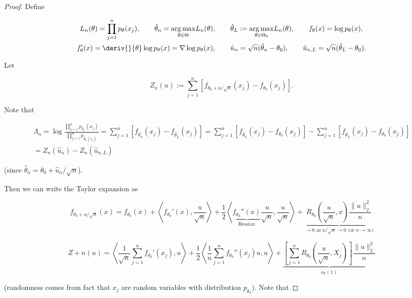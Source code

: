 \begin{proof} Define

\begin{multline*}
L_n(\theta) = \prod_{j=1}^n p_\theta(x_j), \qquad \hat{\theta}_n = \underset{\theta \in \Theta}{\arg \max} L_n(\theta), \qquad \hat{\theta}_L := \underset{\theta \in \Theta_0}{\arg \max} L_n(\theta), \qquad f_\theta(x) = \log p_\theta(x), 
\\ f_\theta '(x) = \deriv{}{\theta} \log p_\theta(x) = \nabla \log p_\theta(x), \qquad \hat{u}_n = \sqrt{n}(\hat{\theta}_n - \theta_0), \qquad \hat{u}_{n,L} = \sqrt{n}(\hat{\theta}_L - \theta_0).
\end{multline*}

Let

\[
Z_n (u)  := \sum_{j=1}^n \left[f_{\theta_0 + u/\sqrt{n}}(x_j) - f_{\theta_0}(x_j)   \right].
\]

Note that 

\begin{multline}\label{mathstats.wilk.Lambda.exp}
\Lambda_n = \log \frac{ \prod_{j=1}^n p_{\hat{\theta}_n} (x_j)}{ \prod_{j=1}^n p_{\hat{\theta}_L (x_j)}} = \sum_{j=1}^n \left[f_{\hat{\theta}_n}(x_j) - f_{\hat{\theta}_L}(x_j) \right] = \sum_{j=1}^n \left[f_{\hat{\theta}_n}(x_j) - f_{\theta_0}(x_j)  \right]  -  \sum_{j=1}^n \left[f_{\hat{\theta}_L}(x_j) - f_{\theta_0}(x_j)  \right] 
\\ = Z_n(\hat{u}_n) - Z_n(\hat{u}_{n,L})
\end{multline}

(since \(\hat{\theta}_n = \theta_0 + \hat{u}_n/\sqrt{n}\)).

Then we can write the Taylor expansion as 

\[
f_{\theta_0 + u/\sqrt{n}}(x)
 = f_{\theta_0}(x) 
 +  \left\langle f_{\theta_0}'(x),  \frac{u}{\sqrt{n}} \right\rangle 
+ \frac{1}{2} \left\langle  \underbrace{f_{\theta_0} ''(x)}_{\text{Hessian}} \frac{u}{\sqrt{n}}, \frac{u}{\sqrt{n}} \right\rangle 
+ \underbrace{R_{\theta_0}\left( \frac{u}{\sqrt{n}}, x \right) \frac{ \lVert u \rVert_2^2}{n}}_{\to 0 \text{ as } u/\sqrt{n} \to 0 \text{ (or } n \to \infty \text{)}}
\]

\[
Z+n(u) = \left\langle \frac{1}{\sqrt{n}} \sum_{j=1}^n f_{\theta_0}'(x_j), u \right\rangle 
+ \frac{1}{2} \left\langle \frac{1}{n} \sum_{j=1}^n f_{\theta_0}''(x_j)u, u \right\rangle 
+ \underbrace{\left[  \sum_{j=1}^n R_{\theta_0} \left( \frac{u}{\sqrt{n}}, X_j \right)\right] \frac{ \lVert u \rVert_2^2}{n}}_{o_{\mathbb{P}}(1)}
\]

(randomness comes from fact that \(x_j\) are random variables with distribution \(p_{\theta_0}\)). Note that


\end{proof}
